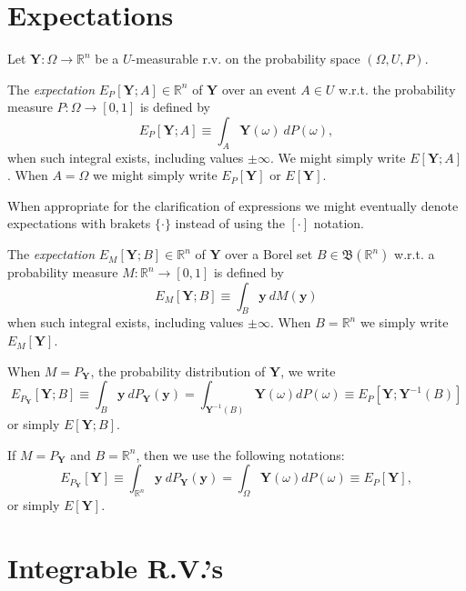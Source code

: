 \section{Expectations}

Let $\mathbf{Y}:\Omega\rightarrow \mathbb{R}^n$ be a $U$-measurable r.v. on the probability space $(\Omega,U,P)$.

The {\it expectation} $E_P[\mathbf{Y};A]\in\mathbb{R}^n$
of $\mathbf{Y}$
over an event $A\in U$
w.r.t. the probability measure $P:\Omega\rightarrow [0,1]$
is defined by
\begin{equation*}
E_P[\mathbf{Y};A] \equiv
\int_{A} \mathbf{Y}(\omega)~dP(\omega),
\end{equation*}
when such integral exists, including values $\pm\infty$.
We might simply write $E[\mathbf{Y};A]$.
When $A=\Omega$ we might simply write $E_P[\mathbf{Y}]$ or $E[\mathbf{Y}]$.

When appropriate for the clarification of expressions
we might eventually denote expectations with brakets $\{\cdot\}$ instead of using the $[\cdot]$ notation.

The {\it expectation} $E_M[\mathbf{Y};B]\in\mathbb{R}^n$
of $\mathbf{Y}$
over a Borel set $B\in\mathfrak{B}(\mathbb{R}^n)$
w.r.t. a probability measure $M:\mathbb{R}^n\rightarrow [0,1]$
is defined by
\begin{equation*}
E_M[\mathbf{Y};B] \equiv
\int_{B} \mathbf{y}~dM(\mathbf{y})
\end{equation*}
when such integral exists, including values $\pm\infty$.
When $B=\mathbb{R}^n$ we simply write
$E_M[\mathbf{Y}]$.

When $M=P_{\mathbf{Y}}$, the probability distribution of $\mathbf{Y}$, we write
\begin{equation*}
E_{P_{\mathbf{Y}}}[\mathbf{Y};B] \equiv
\int_{B} \mathbf{y}~dP_\mathbf{Y}(\mathbf{y}) =
\int_{\mathbf{Y}^{-1}(B)}\mathbf{Y}(\omega)dP(\omega) \equiv
E_P[\mathbf{Y};\mathbf{Y}^{-1}(B)]
\end{equation*}
or simply
$E[\mathbf{Y};B]$.

If $M=P_{\mathbf{Y}}$ and $B=\mathbb{R}^n$, then we use the following notations:
\begin{equation*}
E_{P_{\mathbf{Y}}}[\mathbf{Y}] \equiv
\int_{\mathbb{R}^n} \mathbf{y}~dP_\mathbf{Y}(\mathbf{y}) = 
\int_{\Omega}\mathbf{Y}(\omega)dP(\omega) \equiv
E_P[\mathbf{Y}],
\end{equation*}
or simply
$E[\mathbf{Y}]$.

\section{Integrable R.V.'s}

